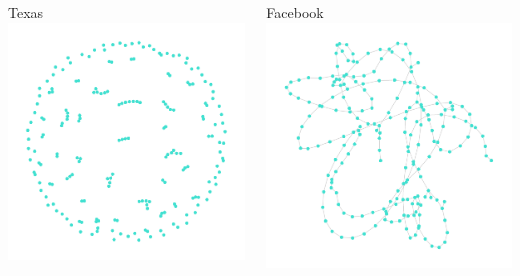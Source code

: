 \documentclass{beamer}
\begin{document}
\begin{frame}
\begin{columns}
\begin{column}[t]{0.5\textwidth}
\begin{block}{Texas}
        \includegraphics[scale=0.3]{fig/texas_ff}
      \end{block}
    \end{column}
    \begin{column}[t]{0.5\textwidth}
      \begin{block}{Facebook}
        \centering
        \includegraphics[scale=0.3]{fig/facebook_rw}\par

\end{block}
\end{column}
\end{columns}
\end{frame}
\end{document}

